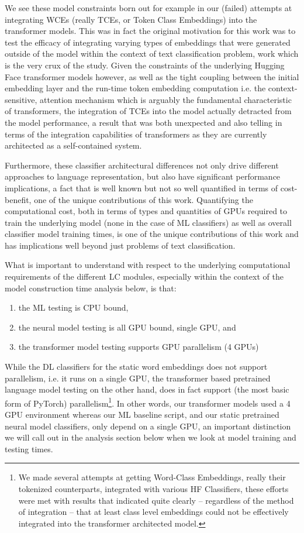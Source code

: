 \documentclass[final]{clv2025}
\begin{document}
We see these model constraints born out for example in our (failed) attempts at integrating WCEs (really TCEs, or Token Class Embeddings) into the transformer models. This was in fact the original motivation for this work was to test the efficacy of integrating varying types of embeddings that were generated outside of the model within the context of text classification problem, work which is the very crux of the \cite{moreo} study. Given the constraints of the underlying Hugging Face transformer models however, as well as the tight coupling between the initial embedding layer and the run-time token embedding computation i.e. the context-sensitive, attention mechanism which is arguably the fundamental characteristic of transformers, the integration of TCEs into the model actually detracted from the model performance, a result that was both unexpected and also telling in terms of the integration capabilities of transformers as they are currently architected as a self-contained system.

Furthermore, these classifier architectural differences not only drive different approaches to language representation, but also have significant performance implications, a fact that is well known but not so well quantified in terms of cost-benefit, one of the unique contributions of this work. Quantifying the computational cost, both in terms of types and quantities of GPUs required to train the underlying model (none in the case of ML classifiers) as well as overall classifier model training times, is one of the unique contributions of this work and has implications well beyond just problems of text classification. 

What is important to understand with respect to the underlying computational requirements of the different LC modules, especially within the context of the model construction time analysis below, is that:
\begin{enumerate}
    \item the ML testing is CPU bound,
    \item the neural model testing is all GPU bound, single GPU, and 
    \item the transformer model testing supports GPU parallelism (4 GPUs)
\end{enumerate}

While the DL classifiers for the static word embeddings does not support parallelism, i.e. it runs on a single GPU, the transformer based pretrained language model testing on the other hand, does in fact support (the most basic form of PyTorch) parallelism\footnote{We made several attempts at getting Word-Class Embeddings, really their tokenized counterparts, integrated with various HF Classifiers, these efforts were met with results that indicated quite clearly – regardless of the method of integration – that at least class level embeddings could not be effectively integrated into the transformer architected model.}.  In other words, our transformer models used a 4 GPU environment whereas our ML baseline script, and our static pretrained neural model classifiers, only depend on a single GPU, an important distinction we will call out in the analysis section below when we look at model training and testing times.
\end{document}
